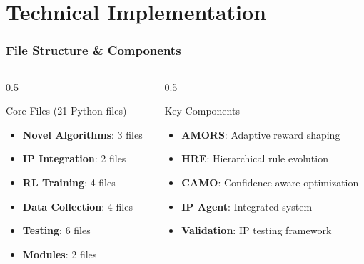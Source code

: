 \documentclass{beamer}
\begin{document}
\section{Technical Implementation}

\begin{frame}
\frametitle{File Structure \& Components}
\begin{columns}
\begin{column}{0.5\textwidth}
\begin{block}{Core Files (21 Python files)}
\begin{itemize}
\item \textbf{Novel Algorithms}: 3 files
\item \textbf{IP Integration}: 2 files
\item \textbf{RL Training}: 4 files
\item \textbf{Data Collection}: 4 files
\item \textbf{Testing}: 6 files
\item \textbf{Modules}: 2 files
\end{itemize}
\end{block}
\end{column}
\begin{column}{0.5\textwidth}
\begin{block}{Key Components}
\begin{itemize}
\item \textbf{AMORS}: Adaptive reward shaping
\item \textbf{HRE}: Hierarchical rule evolution
\item \textbf{CAMO}: Confidence-aware optimization
\item \textbf{IP Agent}: Integrated system
\item \textbf{Validation}: IP testing framework
\end{itemize}
\end{block}
\end{column}
\end{columns}
\end{frame}
\end{document}
